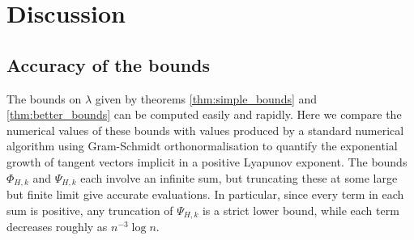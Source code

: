 \documentclass{iopart}
\begin{document}
\section{Discussion}\label{sec:discuss}

\subsection{Accuracy of the bounds}

The bounds on $\lambda$ given by theorems \ref{thm:simple_bounds} and \ref{thm:better_bounds} can be computed easily and rapidly. Here we compare the numerical values of these bounds with values produced by a standard numerical algorithm \cite{parker2012practical} using Gram-Schmidt orthonormalisation to quantify the exponential growth of tangent vectors implicit 
in a positive Lyapunov exponent. The bounds $\Phi_{H,k}$ and $\Psi_{H,k}$ each involve an infinite sum, but truncating these at some large but finite limit give accurate evaluations. In particular, since every term in each sum is positive, any truncation of $\Psi_{H,k}$ is a strict lower bound, while each term decreases roughly as $n^{-3}\log n$. 
\end{document}
